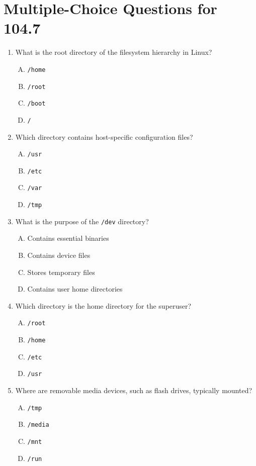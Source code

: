 \documentclass[a4paper]{report}
\begin{document}
\section*{Multiple-Choice Questions for 104.7}
\begin{enumerate}[1.]

    \item What is the root directory of the filesystem hierarchy in Linux?  
    \begin{enumerate}[A)]
        \item \texttt{/home}  
        \item \texttt{/root}  
        \item \texttt{/boot}  
        \item \texttt{/}  
    \end{enumerate}

    \item Which directory contains host-specific configuration files?  
    \begin{enumerate}[A)]
        \item \texttt{/usr}  
        \item \texttt{/etc}  
        \item \texttt{/var}  
        \item \texttt{/tmp}  
    \end{enumerate}

    \item What is the purpose of the \texttt{/dev} directory?  
    \begin{enumerate}[A)]
        \item Contains essential binaries  
        \item Contains device files  
        \item Stores temporary files  
        \item Contains user home directories  
    \end{enumerate}

    \item Which directory is the home directory for the superuser?  
    \begin{enumerate}[A)]
        \item \texttt{/root}  
        \item \texttt{/home}  
        \item \texttt{/etc}  
        \item \texttt{/usr}  
    \end{enumerate}

    \item Where are removable media devices, such as flash drives, typically mounted?  
    \begin{enumerate}[A)]
        \item \texttt{/tmp}  
        \item \texttt{/media}  
        \item \texttt{/mnt}  
        \item \texttt{/run}  
    \end{enumerate}


\end{enumerate}
\end{document}
